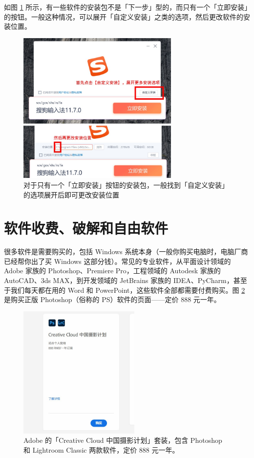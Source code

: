 如图 \ref{sogou-install} 所示，有一些软件的安装包不是「下一步」型的，而只有一个「立即安装」的按钮。一般这种情况，可以展开「自定义安装」之类的选项，然后更改软件的安装位置。

\begin{figure}[htb!]
  \centering
  \includegraphics[width=8cm]{assets/Sogou_change_directory.jpg}
  \caption{对于只有一个「立即安装」按钮的安装包，一般找到「自定义安装」的选项展开后即可更改安装位置}
  \label{sogou-install}
\end{figure}

\section{软件收费、破解和自由软件}

很多软件是需要购买的，包括 Windows 系统本身（一般你购买电脑时，电脑厂商已经帮你出了买 Windows 这部分钱）。常见的专业软件，从平面设计领域的 Adobe 家族的 Photoshop、Premiere Pro，工程领域的 Autodesk 家族的 AutoCAD、3ds MAX，到开发领域的 JetBrains 家族的 IDEA、PyCharm，甚至于我们每天都在用的 Word 和 PowerPoint，这些软件全部都需要付费购买。图 \ref{buy-adobe} 是购买正版 Photoshop（俗称的 PS）软件的页面——定价 888 元一年。

\begin{figure}[htb!]
  \centering
  \includegraphics[width=6cm]{assets/Adobe.jpg}
  \caption{Adobe 的「Creative Cloud 中国摄影计划」套装，包含 Photoshop 和 Lightroom Classic 两款软件，定价 888 元一年。}
  \label{buy-adobe}
\end{figure}

